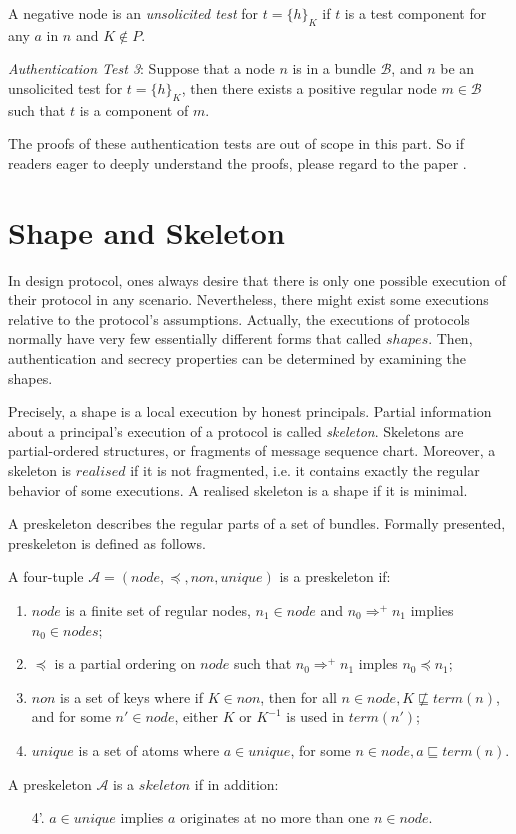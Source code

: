 \begin{Definition} 
A negative node is an \emph{unsolicited test} for $t = \{h\}_K$ if $t$ is a test component for any $a$ in $n$ and $K \not\in P$. 
\end{Definition}

\emph{Authentication Test 3}: Suppose that a node $n$ is in a bundle $\mathcal{B}$, and $n$ be an unsolicited test for $t = \{h\}_K$, then there exists a positive regular node $m \in \mathcal{B}$ such that $t$ is a component of $m$. 
 
The proofs of these authentication tests are out of scope in this part. So if readers eager to deeply understand the proofs, please regard to the paper \cite{Guttman:2002:ATS:568264.568267}.


\section{Shape and Skeleton}

In design protocol, ones always desire that there is only one possible execution of their protocol in any scenario. Nevertheless, there might exist some executions relative to the protocol's assumptions. Actually, the executions of protocols normally have very few essentially different forms that called $shapes$. Then, authentication and secrecy properties can be determined by examining the shapes.

Precisely, a shape is a local execution by honest principals. Partial information about a principal's execution of a protocol is called \emph{skeleton}. Skeletons are partial-ordered structures, or fragments of message sequence chart. Moreover, a skeleton is $realised$ if it is not fragmented, i.e. it contains exactly the regular behavior of some executions. A realised skeleton is a shape if it is minimal. 

A preskeleton describes the regular parts of a set of bundles. Formally presented, preskeleton is defined as follows.
\begin{Definition}[Skeleton]A four-tuple $\mathcal{A} = (node, \preceq, non, unique)$ is a preskeleton if:
	\begin{enumerate}
	\item $node$ is a finite set of regular nodes, $n_1 \in node$ and $n_0 \Rightarrow^+ n_1$ implies $n_0 \in nodes$;
	\item $\preceq$ is a partial ordering on $node$ such that $n_0 \Rightarrow^+ n_1$ imples $n_0 \preceq n_1$;
	\item $non$ is a set of keys where if $K \in non$, then for all $n \in node, K\not\sqsubseteq term(n)$, and for some $n' \in node$, either $K$ or $K^{-1}$ is used in $term(n')$;
	\item $unique$ is a set of atoms where $a \in unique$, for some $n \in node, a \sqsubseteq term(n)$. 
	\end{enumerate}
	A preskeleton $\mathcal{A}$ is a $skeleton$ if in addition:
	\begin{enumerate}
	\item[4'.] $a\in unique$ implies $a$ originates at no more than one $n\in node$. 
	\end{enumerate}
\end{Definition}

